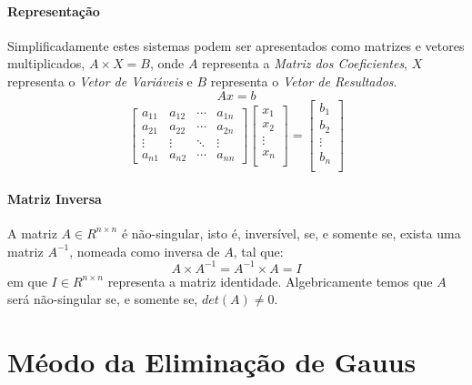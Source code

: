 \documentclass{article}
\begin{document}
        \paragraph{Representação}Simplificadamente estes sistemas podem ser apresentados como matrizes e vetores multiplicados, $A \times X = B$, onde $A$ representa a \textit{Matriz dos Coeficientes}, $X$ representa o \textit{Vetor de Variáveis} e $B$ representa o \textit{Vetor de Resultados}.
            \[Ax=b\]
            \[
                \begin{bmatrix}
                    a_{11} & a_{12} & \cdots & a_{1n}\\
                    a_{21} & a_{22} & \cdots & a_{2n}\\
                    \vdots & \vdots & \ddots & \vdots\\
                    a_{n1} & a_{n2} & \cdots & a_{nn}
                \end{bmatrix}
                \begin{bmatrix}
                    x_{1}\\
                    x_{2}\\
                    \vdots\\
                    x_{n}\\
                \end{bmatrix}=
                \begin{bmatrix}
                    b_{1}\\
                    b_{2}\\
                    \vdots\\
                    b_{n}\\
                \end{bmatrix}
            \]

        \paragraph{Matriz Inversa}A matriz $A \in R^{n \times n}$ é não-singular, isto é, inversível,  se, e somente se, exista uma matriz $A^{-1}$, nomeada como inversa de $A$, tal que: \[A \times A^{-1} = A^{-1} \times A = I\] em que $I \in R^{n \times n}$ representa a matriz identidade. Algebricamente temos que $A$ será não-singular se, e somente se, $det(A) \neq 0$.
\newpage

    \section{Méodo da Eliminação de Gauus}
\end{document}
